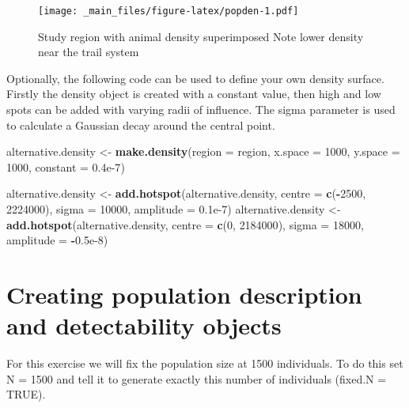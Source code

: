 \documentclass[]{book}
\newenvironment{Shaded}{\begin{snugshade}}{\end{snugshade}}
\newcommand{\KeywordTok}[1]{\textcolor[rgb]{0.13,0.29,0.53}{\textbf{#1}}}
\newcommand{\DataTypeTok}[1]{\textcolor[rgb]{0.13,0.29,0.53}{#1}}
\newcommand{\DecValTok}[1]{\textcolor[rgb]{0.00,0.00,0.81}{#1}}
\newcommand{\FloatTok}[1]{\textcolor[rgb]{0.00,0.00,0.81}{#1}}
\newcommand{\StringTok}[1]{\textcolor[rgb]{0.31,0.60,0.02}{#1}}
\newcommand{\OperatorTok}[1]{\textcolor[rgb]{0.81,0.36,0.00}{\textbf{#1}}}
\newcommand{\NormalTok}[1]{#1}
\theoremstyle{definition}
\theoremstyle{definition}
\theoremstyle{remark}
\begin{document}
\begin{figure}
\centering
\texttt{[image: \_main\_files/figure-latex/popden-1.pdf]}
\caption{\label{fig:popden}Study region with animal density superimposed
Note lower density near the trail system}
\end{figure}

Optionally, the following code can be used to define your own density
surface. Firstly the density object is created with a constant value,
then high and low spots can be added with varying radii of influence.
The sigma parameter is used to calculate a Gaussian decay around the
central point.

\begin{Shaded}
\begin{Highlighting}[]
\NormalTok{alternative.density <-}\StringTok{ }\KeywordTok{make.density}\NormalTok{(}\DataTypeTok{region =}\NormalTok{ region, }\DataTypeTok{x.space =} \DecValTok{1000}\NormalTok{, }
                                    \DataTypeTok{y.space =} \DecValTok{1000}\NormalTok{, }\DataTypeTok{constant =} \FloatTok{0.4e-7}\NormalTok{)}

\NormalTok{alternative.density <-}\StringTok{ }\KeywordTok{add.hotspot}\NormalTok{(alternative.density, }\DataTypeTok{centre =} \KeywordTok{c}\NormalTok{(}\OperatorTok{-}\DecValTok{2500}\NormalTok{, }\DecValTok{2224000}\NormalTok{), }
                                   \DataTypeTok{sigma =} \DecValTok{10000}\NormalTok{, }\DataTypeTok{amplitude =} \FloatTok{0.1e-7}\NormalTok{)}
\NormalTok{alternative.density <-}\StringTok{ }\KeywordTok{add.hotspot}\NormalTok{(alternative.density, }\DataTypeTok{centre =} \KeywordTok{c}\NormalTok{(}\DecValTok{0}\NormalTok{, }\DecValTok{2184000}\NormalTok{), }
                                   \DataTypeTok{sigma =} \DecValTok{18000}\NormalTok{, }\DataTypeTok{amplitude =} \OperatorTok{-}\FloatTok{0.5e-8}\NormalTok{)}
\end{Highlighting}
\end{Shaded}

\section{Creating population description and detectability
objects}\label{creating-population-description-and-detectability-objects}

For this exercise we will fix the population size at 1500 individuals.
To do this set N = 1500 and tell it to generate exactly this number of
individuals (fixed.N = TRUE).
\end{document}
